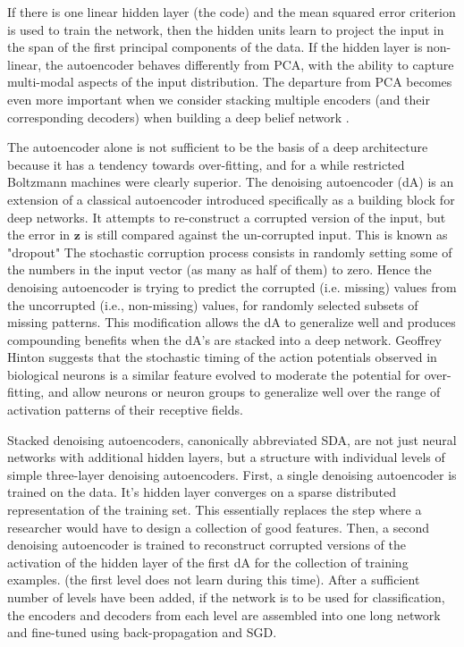\documentclass[12pt]{article}
\begin{document}
\begin{doublespacing}
If there is one linear hidden layer (the code) and the mean squared error criterion is used to train the network, then the  hidden units learn to project the input in the span of the first  principal components of the data. If the hidden layer is non-linear, the autoencoder behaves differently from PCA, with the ability to capture multi-modal aspects of the input distribution. The departure from PCA becomes even more important when we consider stacking multiple encoders (and their corresponding decoders) when building a deep belief network \cite{hinton2006reducing}.

The autoencoder alone is not sufficient to be the basis of a deep architecture because it has a tendency towards over-fitting, and for a while restricted Boltzmann machines were clearly superior. The denoising autoencoder (dA) is an extension of a classical autoencoder introduced specifically as a building block for deep networks\cite{vincent2008extracting}.  It attempts to re-construct a corrupted version of the input, but the error in $\mathbf z$ is still compared against the un-corrupted input. This is known as "dropout" The stochastic corruption process consists in randomly setting some of the numbers in the input vector (as many as half of them) to zero. Hence the denoising autoencoder is trying to predict the corrupted (i.e. missing) values from the uncorrupted (i.e., non-missing) values, for randomly selected subsets of missing patterns. This modification allows the dA to generalize well and produces compounding benefits when the dA's are stacked into a deep network\cite{hinton2006reducing}. Geoffrey Hinton suggests that the stochastic timing of the action potentials observed in biological neurons is a similar feature evolved to moderate the potential for over-fitting, and allow neurons or neuron groups to generalize well over the range of activation patterns of their receptive fields.
	
Stacked denoising autoencoders, canonically abbreviated SDA, are not just neural networks with additional hidden layers, but a structure with individual levels of simple three-layer denoising autoencoders. First, a single denoising autoencoder is trained on the data. It's hidden layer converges on a sparse distributed representation of the training set. This essentially replaces the step where a researcher would have to design a collection of good features. Then, a second denoising autoencoder is trained to reconstruct corrupted versions of the activation of the hidden layer of the first dA for the collection of training examples. (the first level does not learn during this time). After a sufficient number of levels have been added, if the network is to be used for classification, the encoders and decoders from each level are assembled into one long network and fine-tuned using back-propagation and SGD.


\end{doublespacing}
\end{document}
